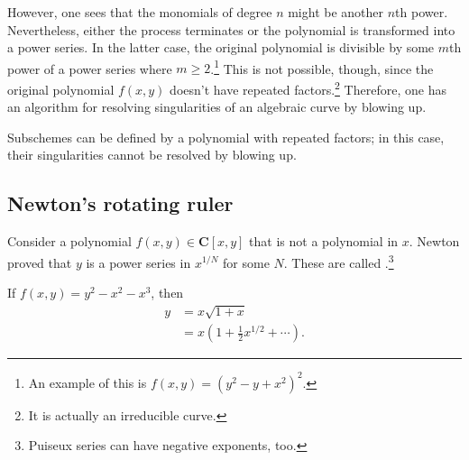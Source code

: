 \documentclass [11 pt, oneside, margin = 1 in] {article}
\begin{document}
However, one sees that the monomials of degree $n$ might be another $n$th power. Nevertheless, either the process terminates or the polynomial is transformed into a power series. In the latter case, the original polynomial is divisible by some $m$th power of a power series where $m\ge 2$.\footnote{An example of this is $f(x,y)= (y^2-y+x^2)^2$.} This is not possible, though, since the original polynomial $f(x,y)$ doesn't have repeated factors.\footnote{It is actually an irreducible curve.} Therefore, one has an algorithm for resolving singularities of an algebraic curve by blowing up.

\begin{remark}
	Subschemes can be defined by a polynomial with repeated factors; in this case, their singularities cannot be resolved by blowing up.
\end{remark}

\subsection{Newton's rotating ruler}
Consider a polynomial $f(x,y)\in  \mathbf{C}[x,y]$ that is not a polynomial in $x$. Newton proved that $y$ is a power series in $x^{1/N}$ for some $N$. These are called .\footnote{Puiseux series can have negative exponents, too.}

\begin{example}[ ]\label{}\text{}
If $f(x,y) = y^2-x^2 -x^3$, then
\begin{align*}
	y &= x\sqrt{1+x}\\
	  &= x \left( 1 + \frac{1}{2}x^{1/2} + \cdots \right). 
\end{align*}
\end{example}
\end{document}
